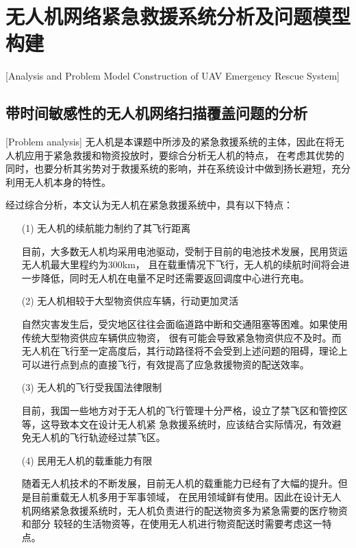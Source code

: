 
\chapter{无人机网络紧急救援系统分析及问题模型构建}[Analysis and Problem Model Construction of UAV Emergency Rescue System]

\section{带时间敏感性的无人机网络扫描覆盖问题的分析}[Problem analysis]
无人机是本课题中所涉及的紧急救援系统的主体，因此在将无人机应用于紧急救援和物资投放时，要综合分析无人机的特点，
在考虑其优势的同时，也要分析其劣势对于救援系统的影响，并在系统设计中做到扬长避短，充分利用无人机本身的特性。


经过综合分析，本文认为无人机在紧急救援系统中，具有以下特点：
\begin{itemize}
	\item [(1)] 
	无人机的续航能力制约了其飞行距离


	\qquad 目前，大多数无人机均采用电池驱动，受制于目前的电池技术发展，民用货运无人机最大里程约为300km，
	且在载重情况下飞行，无人机的续航时间将会进一步降低，同时无人机在电量不足时还需要返回调度中心进行充电\cite{jin2017}。
	\item [(2)]
	无人机相较于大型物资供应车辆，行动更加灵活


	\qquad 自然灾害发生后，受灾地区往往会面临道路中断和交通阻塞等困难。如果使用传统大型物资供应车辆供应物资，
	很有可能会导致紧急物资供应不及时。而无人机在飞行至一定高度后，其行动路径将不会受到上述问题的阻碍，理论上
	可以进行点到点的直接飞行，有效提高了应急救援物资的配送效率\cite{chenhao2019}。
	\item [(3)]
	无人机的飞行受我国法律限制


	\qquad 目前，我国一些地方对于无人机的飞行管理十分严格，设立了禁飞区和管控区等\cite{shu2020}，这导致本文在设计无人机紧
	急救援系统时，应该结合实际情况，有效避免无人机的飞行轨迹经过禁飞区。
	\item [(4)]
	民用无人机的载重能力有限


	\qquad 随着无人机技术的不断发展，目前无人机的载重能力已经有了大幅的提升。但是目前重载无人机多用于军事领域，
	在民用领域鲜有使用。因此在设计无人机网络紧急救援系统时，无人机负责进行的配送物资多为紧急需要的医疗物资和部分
	较轻的生活物资等，在使用无人机进行物资配送时需要考虑这一特点\cite{liuping2016}。
\end{itemize}

